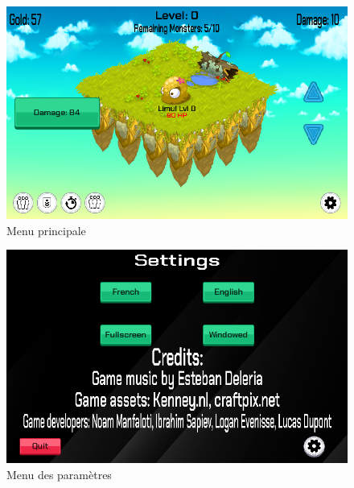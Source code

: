 \documentclass[11pt,a4paper]{article}
\begin{document}
\begin{figure}[h] 
    \centering 
    \includegraphics[width=12cm]{img/jeuPrincipale.png} 
    \caption{Menu principale}
\end{figure}
\begin{figure}[h] 
    \centering 
    \includegraphics[width=12cm]{img/Parametre.png} 
    \caption{Menu des paramètres}
\end{figure}
\end{document}
